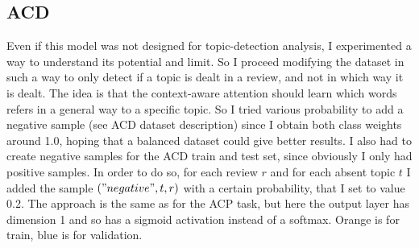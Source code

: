 \documentclass{article}
\begin{document}
        \subsection{ACD}\label{subsec:s2}
            Even if this model was not designed for topic-detection analysis, I experimented a way to understand its potential and limit.
            So I proceed modifying the dataset in such a way to only detect if a topic is dealt in a review, and not in which way it is dealt.
            The idea is that the context-aware attention should learn which words refers in a general way to a specific topic.
            So I tried various probability to add a negative sample (see ACD dataset description) since I obtain both class weights around 1.0, hoping that a balanced dataset could give better results.
            I also had to create negative samples for the ACD train and test set, since obviously I only had positive samples.
            In order to do so, for each review $r$ and for each absent topic $t$ I added the sample $("negative", t, r)$ with a certain probability, that I set to value 0.2.
            The approach is the same as for the ACP task, but here the output layer has dimension 1 and so has a sigmoid activation instead of a softmax.
            \color{orange} Orange is for train, \color{blue} blue is for validation.\color{black}
\end{document}
